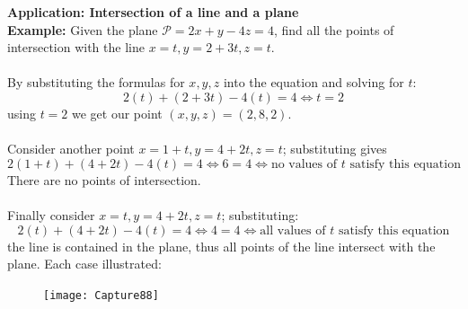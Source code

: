 \documentclass{report}
\begin{document}
\newpage
\noindent\textbf{Application: Intersection of a line and a plane}\\
\textbf{Example:} Given the plane $\mathcal{P}=2x+y-4z=4$, find all the points
of intersection with the line $x=t,y=2+3t,z=t$.\\
\vspace{1mm}\\
By substituting the formulas for $x,y,z$ into the equation and solving for $t$:
\begin{equation*}
2(t)+(2+3t)-4(t)=4\iff t=2
\end{equation*}
using $t=2$ we get our point $(x,y,z)=(2,8,2)$.\\
\vspace{1mm}\\
Consider another point $x=1+t,y=4+2t,z=t$; substituting gives
\begin{equation*}
2(1+t)+(4+2t)-4(t)=4\iff 6=4\iff\text{no values of $t$ satisfy this equation}
\end{equation*}
There are no points of intersection.\\
\vspace{1mm}\\
Finally consider $x=t,y=4+2t,z=t$; substituting:
\begin{equation*}
2(t)+(4+2t)-4(t)=4\iff4=4\iff\text{all values of $t$ satisfy this equation}
\end{equation*}
the line is contained in the plane, thus all points of the line intersect with the 
plane. Each case illustrated:
\begin{figure}[h]
\texttt{[image: Capture88]}\\
\centering
\end{figure}
\newpage
\end{document}
